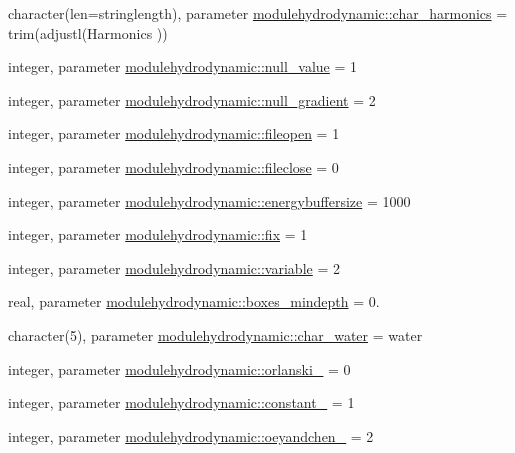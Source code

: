 \begin{DoxyCompactItemize}
\item 
character(len=stringlength), parameter \mbox{\hyperlink{namespacemodulehydrodynamic_a67dadb80ec9687942a901acc6fb202af}{modulehydrodynamic\+::char\+\_\+harmonics}} = trim(adjustl(\textquotesingle{}Harmonics\textquotesingle{} ))
\item 
integer, parameter \mbox{\hyperlink{namespacemodulehydrodynamic_a49aaf47fd883f68b02770ba74b7e1851}{modulehydrodynamic\+::null\+\_\+value}} = 1
\item 
integer, parameter \mbox{\hyperlink{namespacemodulehydrodynamic_a6421eb8c0ace0ea4db3925349c646611}{modulehydrodynamic\+::null\+\_\+gradient}} = 2
\item 
integer, parameter \mbox{\hyperlink{namespacemodulehydrodynamic_aa4ad740c2db59b8989dc3b2d36df55e1}{modulehydrodynamic\+::fileopen}} = 1
\item 
integer, parameter \mbox{\hyperlink{namespacemodulehydrodynamic_ad6e8be842adda6d1ba720cb98e07c97c}{modulehydrodynamic\+::fileclose}} = 0
\item 
integer, parameter \mbox{\hyperlink{namespacemodulehydrodynamic_a1975a4833b98bfa1952ccaa94ff3aefd}{modulehydrodynamic\+::energybuffersize}} = 1000
\item 
integer, parameter \mbox{\hyperlink{namespacemodulehydrodynamic_a5fa642d0dd66cf229c8006ada4b3b94f}{modulehydrodynamic\+::fix}} = 1
\item 
integer, parameter \mbox{\hyperlink{namespacemodulehydrodynamic_a51cc729c6be952db84e6f51bc75a59aa}{modulehydrodynamic\+::variable}} = 2
\item 
real, parameter \mbox{\hyperlink{namespacemodulehydrodynamic_ab09faae6f85b0c6a4f7ac6ba7ca019eb}{modulehydrodynamic\+::boxes\+\_\+mindepth}} = 0.
\item 
character(5), parameter \mbox{\hyperlink{namespacemodulehydrodynamic_a2d70746f75e0e069bb2d66e5960ae5ae}{modulehydrodynamic\+::char\+\_\+water}} = \textquotesingle{}water\textquotesingle{}
\item 
integer, parameter \mbox{\hyperlink{namespacemodulehydrodynamic_a73d0342a55e53e1134834b19e62e3930}{modulehydrodynamic\+::orlanski\+\_\+}} = 0
\item 
integer, parameter \mbox{\hyperlink{namespacemodulehydrodynamic_ad91ecb74d9675d514a8723daee9edd08}{modulehydrodynamic\+::constant\+\_\+}} = 1
\item 
integer, parameter \mbox{\hyperlink{namespacemodulehydrodynamic_adff8a3079675a9f7457aed3e2c500949}{modulehydrodynamic\+::oeyandchen\+\_\+}} = 2
\item 

\end{DoxyCompactItemize}
